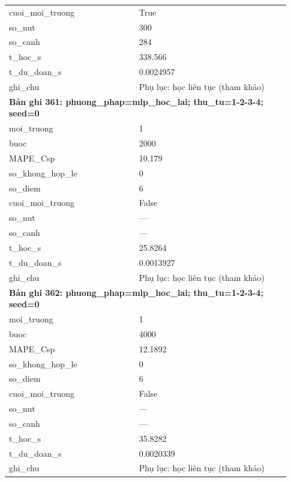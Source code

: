 \begin{longtable}{p{0.43\linewidth}p{0.50\linewidth}}
cuoi\_\allowbreak moi\_\allowbreak truong & True \\
so\_\allowbreak nut & 300 \\
so\_\allowbreak canh & 284 \\
t\_\allowbreak hoc\_\allowbreak s & 338.566 \\
t\_\allowbreak du\_\allowbreak doan\_\allowbreak s & 0.0024957 \\
ghi\_\allowbreak chu & Phụ lục: học liên tục (tham khảo) \\
\midrule
\multicolumn{2}{p{0.95\linewidth}}{\textbf{Bản ghi 361: phuong\_phap=mlp\_hoc\_lai; thu\_tu=1-2-3-4; seed=0}} \\
moi\_\allowbreak truong & 1 \\
buoc & 2000 \\
MAPE\_\allowbreak Csp & 10.179 \\
so\_\allowbreak khong\_\allowbreak hop\_\allowbreak le & 0 \\
so\_\allowbreak diem & 6 \\
cuoi\_\allowbreak moi\_\allowbreak truong & False \\
so\_\allowbreak nut & — \\
so\_\allowbreak canh & — \\
t\_\allowbreak hoc\_\allowbreak s & 25.8264 \\
t\_\allowbreak du\_\allowbreak doan\_\allowbreak s & 0.0013927 \\
ghi\_\allowbreak chu & Phụ lục: học liên tục (tham khảo) \\
\midrule
\multicolumn{2}{p{0.95\linewidth}}{\textbf{Bản ghi 362: phuong\_phap=mlp\_hoc\_lai; thu\_tu=1-2-3-4; seed=0}} \\
moi\_\allowbreak truong & 1 \\
buoc & 4000 \\
MAPE\_\allowbreak Csp & 12.1892 \\
so\_\allowbreak khong\_\allowbreak hop\_\allowbreak le & 0 \\
so\_\allowbreak diem & 6 \\
cuoi\_\allowbreak moi\_\allowbreak truong & False \\
so\_\allowbreak nut & — \\
so\_\allowbreak canh & — \\
t\_\allowbreak hoc\_\allowbreak s & 35.8282 \\
t\_\allowbreak du\_\allowbreak doan\_\allowbreak s & 0.0020339 \\
ghi\_\allowbreak chu & Phụ lục: học liên tục (tham khảo) \\

\end{longtable}
